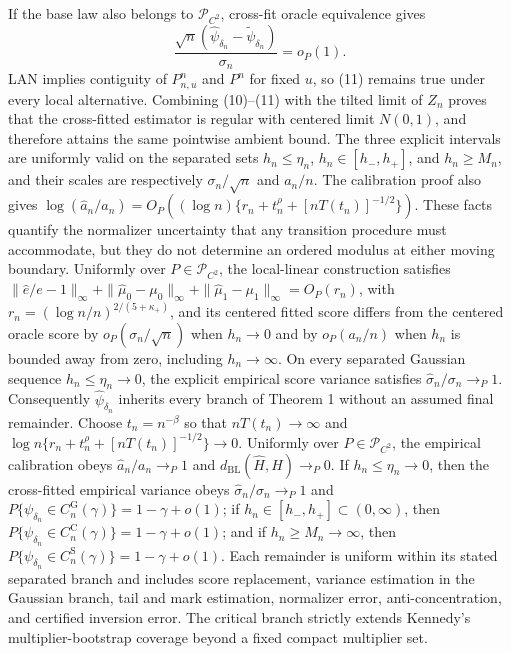 If the base law also belongs to \(\mathcal P_{C^2}\), cross-fit oracle equivalence gives
\[
 \frac{\sqrt n(\widehat\psi_{\delta_n}-\widetilde\psi_{\delta_n})}{\sigma_n}=o_P(1). \tag{11}
\]
LAN implies contiguity of \(P_{n,u}^n\) and \(P^n\) for fixed \(u\), so (11) remains true under every local alternative.  Combining (10)--(11) with the tilted limit of \(Z_n\) proves that the cross-fitted estimator is regular with centered limit \(N(0,1)\), and therefore attains the same pointwise ambient bound.
The three explicit intervals are uniformly valid on the separated sets \(h_n\leq\eta_n\), \(h_n\in[h_-,h_+]\), and \(h_n\geq M_n\), and their scales are respectively \(\sigma_n/\sqrt n\) and \(a_n/n\).  The calibration proof also gives \(\log(\widehat a_n/a_n)=O_P((\log n)\{r_n+t_n^\rho+[nT(t_n)]^{-1/2}\})\).  These facts quantify the normalizer uncertainty that any transition procedure must accommodate, but they do not determine an ordered modulus at either moving boundary.
Uniformly over \(P\in\mathcal P_{C^2}\), the local-linear construction satisfies \(\|\widehat e/e-1\|_\infty+\|\widehat\mu_0-\mu_0\|_\infty+\|\widehat\mu_1-\mu_1\|_\infty=O_P(r_n)\), with \(r_n=(\log n/n)^{2/(5+\kappa_+)}\), and its centered fitted score differs from the centered oracle score by \(o_P(\sigma_n/\sqrt n)\) when \(h_n\to0\) and by \(o_P(a_n/n)\) when \(h_n\) is bounded away from zero, including \(h_n\to\infty\). On every separated Gaussian sequence \(h_n\leq\eta_n\to0\), the explicit empirical score variance satisfies \(\widehat\sigma_n/\sigma_n\to_P1\). Consequently \(\widehat\psi_{\delta_n}\) inherits every branch of Theorem 1 without an assumed final remainder.
Choose \(t_n=n^{-\beta}\) so that \(nT(t_n)\to\infty\) and \(\log n\{r_n+t_n^\rho+[nT(t_n)]^{-1/2}\}\to0\). Uniformly over \(P\in\mathcal P_{C^2}\), the empirical calibration obeys \(\widehat a_n/a_n\to_P1\) and \(d_{\mathrm{BL}}(\widehat H,H)\to_P0\). If \(h_n\leq\eta_n\to0\), then the cross-fitted empirical variance obeys \(\widehat\sigma_n/\sigma_n\to_P1\) and \(P\{\psi_{\delta_n}\in C_n^{\mathrm G}(\gamma)\}=1-\gamma+o(1)\); if \(h_n\in[h_-,h_+]\subset(0,\infty)\), then \(P\{\psi_{\delta_n}\in C_n^{\mathrm C}(\gamma)\}=1-\gamma+o(1)\); and if \(h_n\geq M_n\to\infty\), then \(P\{\psi_{\delta_n}\in C_n^{\mathrm S}(\gamma)\}=1-\gamma+o(1)\). Each remainder is uniform within its stated separated branch and includes score replacement, variance estimation in the Gaussian branch, tail and mark estimation, normalizer error, anti-concentration, and certified inversion error. The critical branch strictly extends Kennedy's multiplier-bootstrap coverage beyond a fixed compact multiplier set.
